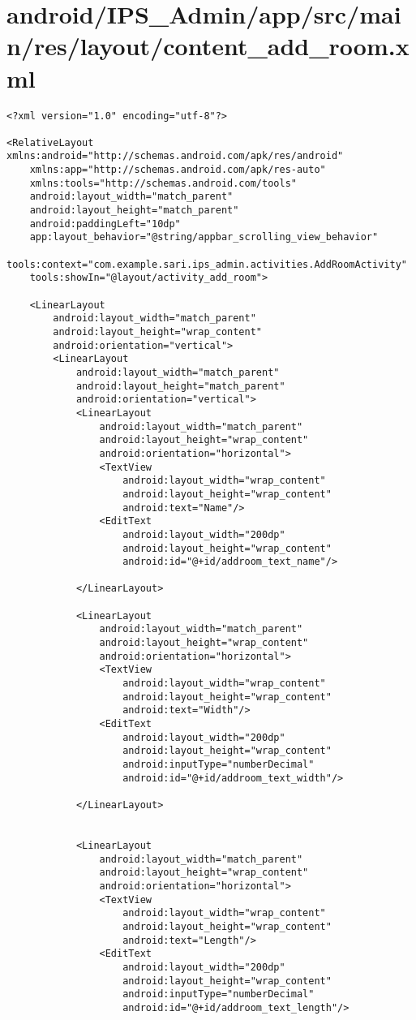 \section{android/IPS\_Admin/app/src/main/res/layout/content_add_room.xml}
\begin{lstlisting}<?xml version="1.0" encoding="utf-8"?>

<RelativeLayout xmlns:android="http://schemas.android.com/apk/res/android"
    xmlns:app="http://schemas.android.com/apk/res-auto"
    xmlns:tools="http://schemas.android.com/tools"
    android:layout_width="match_parent"
    android:layout_height="match_parent"
    android:paddingLeft="10dp"
    app:layout_behavior="@string/appbar_scrolling_view_behavior"
    tools:context="com.example.sari.ips_admin.activities.AddRoomActivity"
    tools:showIn="@layout/activity_add_room">

    <LinearLayout
        android:layout_width="match_parent"
        android:layout_height="wrap_content"
        android:orientation="vertical">
        <LinearLayout
            android:layout_width="match_parent"
            android:layout_height="match_parent"
            android:orientation="vertical">
            <LinearLayout
                android:layout_width="match_parent"
                android:layout_height="wrap_content"
                android:orientation="horizontal">
                <TextView
                    android:layout_width="wrap_content"
                    android:layout_height="wrap_content"
                    android:text="Name"/>
                <EditText
                    android:layout_width="200dp"
                    android:layout_height="wrap_content"
                    android:id="@+id/addroom_text_name"/>

            </LinearLayout>

            <LinearLayout
                android:layout_width="match_parent"
                android:layout_height="wrap_content"
                android:orientation="horizontal">
                <TextView
                    android:layout_width="wrap_content"
                    android:layout_height="wrap_content"
                    android:text="Width"/>
                <EditText
                    android:layout_width="200dp"
                    android:layout_height="wrap_content"
                    android:inputType="numberDecimal"
                    android:id="@+id/addroom_text_width"/>

            </LinearLayout>


            <LinearLayout
                android:layout_width="match_parent"
                android:layout_height="wrap_content"
                android:orientation="horizontal">
                <TextView
                    android:layout_width="wrap_content"
                    android:layout_height="wrap_content"
                    android:text="Length"/>
                <EditText
                    android:layout_width="200dp"
                    android:layout_height="wrap_content"
                    android:inputType="numberDecimal"
                    android:id="@+id/addroom_text_length"/>



\end{lstlisting}

